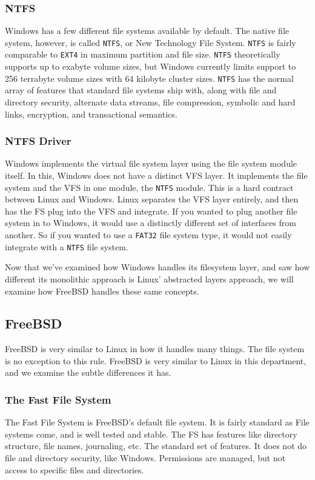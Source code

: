 \documentclass[10pt,letterpaper,onecolumn,draftclsnofoot]{IEEEtran}
\begin{document}
\subsubsection{NTFS}
Windows has a few different file systems available by default. The native file
system, however, is called \texttt{NTFS}, or New Technology File System. 
\texttt{NTFS} is fairly comparable to \texttt{EXT4} in maximum partition and 
file size. \texttt{NTFS} theoretically supports up to exabyte volume sizes, but
Windows currently limits support to 256 terrabyte volume sizes with 64 kilobyte
cluster sizes. \texttt{NTFS} has the normal array of features that standard file
systems ship with, along with file and directory security, alternate data streams,
file compression, symbolic and hard links, encryption, and transactional semantics.
\cite{internals2}
\subsubsection{NTFS Driver}
Windows implements the virtual file system layer using the file system module itself.
In this, Windows does not have a distinct VFS layer. It implements the file system
and the VFS in one module, the \texttt{NTFS} module. This is a hard contract between
Linux and Windows. Linux separates the VFS layer entirely, and then has the FS plug
into the VFS and integrate. If you wanted to plug another file system in to Windows,
it would use a distinctly different set of interfaces from another. So if you wanted
to use a \texttt{FAT32} file system type, it would not easily integrate with a 
\texttt{NTFS} file system. \cite{internals2}

Now that we've examined how Windows handles its filesystem layer, and saw how
different its monolithic approach is Linux' abstracted layers approach, we will
examine how FreeBSD handles these same concepts.

\subsection{FreeBSD}
FreeBSD is very similar to Linux in how it handles many things. The file system
is no exception to this rule. FreeBSD is very similar to Linux in this department,
and we examine the subtle differences it has.
\subsubsection{The Fast File System}
The Fast File System is FreeBSD's default file system. It is fairly standard as
File systems come, and is well tested and stable. The FS has features like directory
structure, file names, journaling, etc. The standard set of features. It does not
do file and directory security, like Windows. Permissions are managed, but not access
to specific files and directories.
\end{document}
